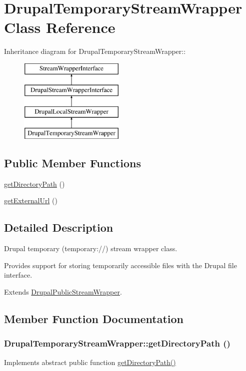 \hypertarget{classDrupalTemporaryStreamWrapper}{
\section{DrupalTemporaryStreamWrapper Class Reference}
\label{classDrupalTemporaryStreamWrapper}
}
Inheritance diagram for DrupalTemporaryStreamWrapper::\begin{figure}[H]
\begin{center}
\leavevmode
\includegraphics[height=4cm]{classDrupalTemporaryStreamWrapper}
\end{center}
\end{figure}
\subsection*{Public Member Functions}
\begin{DoxyCompactItemize}
\item 
\hyperlink{classDrupalTemporaryStreamWrapper_a9ed6d5f9797947b1a6c425b97c17d32d}{getDirectoryPath} ()
\item 
\hyperlink{classDrupalTemporaryStreamWrapper_a289ebf62f0ba1a495cb7682812abba05}{getExternalUrl} ()
\end{DoxyCompactItemize}


\subsection{Detailed Description}
Drupal temporary (temporary://) stream wrapper class.

Provides support for storing temporarily accessible files with the Drupal file interface.

Extends \hyperlink{classDrupalPublicStreamWrapper}{DrupalPublicStreamWrapper}. 

\subsection{Member Function Documentation}
\hypertarget{classDrupalTemporaryStreamWrapper_a9ed6d5f9797947b1a6c425b97c17d32d}{
\subsubsection[{getDirectoryPath}]{\setlength{\rightskip}{0pt plus 5cm}DrupalTemporaryStreamWrapper::getDirectoryPath ()}}
\label{classDrupalTemporaryStreamWrapper_a9ed6d5f9797947b1a6c425b97c17d32d}
Implements abstract public function \hyperlink{classDrupalTemporaryStreamWrapper_a9ed6d5f9797947b1a6c425b97c17d32d}{getDirectoryPath()} 

